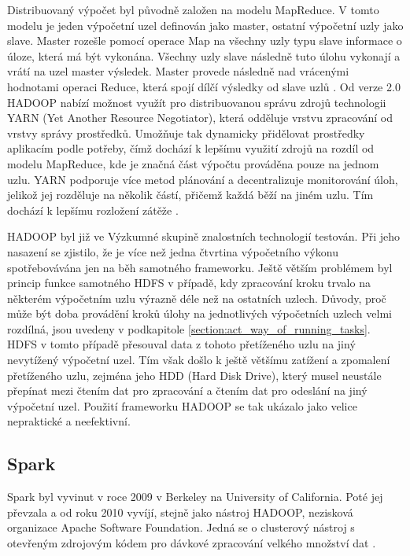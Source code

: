 Distribuovaný výpočet byl původně založen na modelu MapReduce. V tomto modelu je jeden výpočetní uzel definován jako master, ostatní výpočetní uzly jako slave. Master rozešle pomocí operace Map na všechny uzly typu slave informace o úloze, která má být vykonána. Všechny uzly slave následně tuto úlohu vykonají a vrátí na uzel master výsledek. Master provede následně nad vrácenými hodnotami operaci Reduce, která spojí dílčí výsledky od slave uzlů \cite{existTools_MapReduce}. Od verze 2.0 HADOOP nabízí možnost využít pro distribuovanou správu zdrojů technologii YARN (Yet Another Resource Negotiator), která odděluje vrstvu zpracování od vrstvy správy prostředků. Umožňuje tak dynamicky přidělovat prostředky aplikacím podle potřeby, čímž dochází k lepšímu využití zdrojů na rozdíl od modelu MapReduce, kde je značná část výpočtu prováděna pouze na jednom uzlu. YARN podporuje více metod plánování a decentralizuje monitorování úloh, jelikož jej rozděluje na několik částí, přičemž každá běží na jiném uzlu. Tím dochází k lepšímu rozložení zátěže \cite{existTools_Hadoop}.

HADOOP byl již ve Výzkumné skupině znalostních technologií testován. Při jeho nasazení se zjistilo, že je více než jedna čtvrtina výpočetního výkonu spotřebovávána jen na běh samotného frameworku. Ještě větším problémem byl princip funkce samotného HDFS v případě, kdy zpracování kroku trvalo na některém výpočetním uzlu výrazně déle než na ostatních uzlech. Důvody, proč může být doba provádění kroků úlohy na jednotlivých výpočetních uzlech velmi rozdílná, jsou uvedeny v podkapitole \ref{section:act_way_of_running_tasks}. HDFS v tomto případě přesouval data z tohoto přetíženého uzlu na jiný nevytížený výpočetní uzel. Tím však došlo k ještě většímu zatížení a zpomalení přetíženého uzlu, zejména jeho HDD (Hard Disk Drive), který musel neustále přepínat mezi čtením dat pro zpracování a čtením dat pro odeslání na jiný výpočetní uzel. Použití frameworku HADOOP se tak ukázalo jako velice nepraktické a neefektivní.

\subsection*{Spark}

Spark byl vyvinut v roce 2009 v Berkeley na University of California. Poté jej převzala a od roku 2010 vyvíjí, stejně jako nástroj HADOOP, nezisková organizace Apache Software Foundation. Jedná se o clusterový nástroj s otevřeným zdrojovým kódem pro dávkové zpracování velkého množství dat \cite{existTools_Spark_introduction}. 

